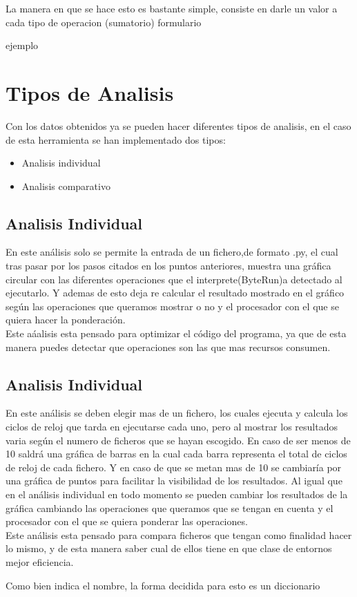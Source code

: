 La manera en que se hace esto es bastante simple, consiste en darle un valor a cada  tipo de operacion
(sumatorio)
formulario

ejemplo

\section{Tipos de Analisis}
Con los datos obtenidos ya se pueden hacer diferentes tipos de analisis, en el caso de esta herramienta se han implementado dos tipos:
\begin{itemize}
	\item Analisis individual
	\item Analisis comparativo
\end{itemize}
 

\subsection{Analisis Individual}
En este análisis solo se permite la entrada de un fichero,de formato .py, el cual tras pasar por los pasos citados en los puntos anteriores, muestra una gráfica circular con las diferentes operaciones que el interprete(ByteRun)a detectado al ejecutarlo. Y ademas de esto  deja re calcular el resultado mostrado en el gráfico según las operaciones que queramos mostrar o no y el procesador  con el que se quiera hacer la ponderación.\\

Este aáalisis esta pensado para optimizar el código del programa, ya que de esta manera puedes detectar que operaciones son las que mas recursos consumen.

\subsection{Analisis Individual}
En este análisis se deben elegir mas de un fichero, los cuales ejecuta y calcula los ciclos de reloj que tarda en ejecutarse cada uno, pero al mostrar los resultados varia según el numero  de ficheros que  se hayan escogido. En caso de ser menos de 10 saldrá una gráfica de barras en la cual cada barra representa el total de ciclos de reloj de cada fichero. Y en caso de que se metan mas de 10 se cambiaría por una  gráfica de puntos para facilitar la visibilidad de los resultados. Al igual que en el análisis  individual en todo momento se pueden cambiar los resultados  de la gráfica cambiando las operaciones que queramos que se tengan en cuenta y el procesador  con el que se quiera ponderar las operaciones.\\

Este análisis esta pensado para compara ficheros que tengan como finalidad hacer lo mismo, y de esta manera saber cual de ellos tiene en que clase de entornos mejor eficiencia.



Como bien indica el nombre, la forma decidida para esto es un diccionario